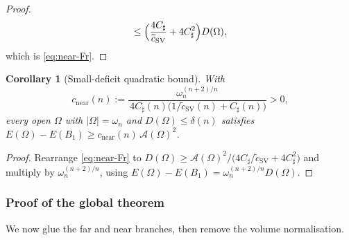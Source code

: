 \documentclass[11pt]{amsart}
\newtheorem{corollary}[theorem]{Corollary}
\theoremstyle{definition}
\newcommand{\Om}{\Omega}
\newcommand{\Fr}{\mathcal A}
\newcommand{\abs}[1]{\left|#1\right|}
\newcommand{\Otilde}{\widetilde{\Omega}}
\begin{document}
\begin{proof}
\begin{align*}
    \le\Bigl(\frac{4C_\sharp}{\widetilde c_{\mathrm{SV}}}+4C_\sharp^2\Bigr)D(\Om),
\end{align*}
which is \eqref{eq:near-Fr}.
\end{proof}

\begin{corollary}[Small-deficit quadratic bound]\label{cor:near}
With
\begin{equation}\label{eq:cnear}
   c_{\mathrm{near}}(n):=
   \frac{\omega_n^{(n+2)/n}}
        {\,4C_\sharp(n)\bigl(1/\widetilde c_{\mathrm{SV}}(n)+C_\sharp(n)\bigr)}>0,
\end{equation}
every open $\Om$ with $\abs{\Om}=\omega_n$ and $D(\Om)\le\delta(n)$
satisfies $E(\Om)-E(B_1)\ge c_{\mathrm{near}}(n)\,\Fr(\Om)^2$.
\end{corollary}

\begin{proof}
Rearrange \eqref{eq:near-Fr} to
$D(\Om)\ge\Fr(\Om)^2/\bigl(4C_\sharp/\widetilde c_{\mathrm{SV}}
+4C_\sharp^2\bigr)$ and multiply by $\omega_n^{(n+2)/n}$, using
$E(\Om)-E(B_1)=\omega_n^{(n+2)/n}D(\Om)$.
\end{proof}

\subsubsection{Proof of the global theorem}\label{ssec:global-proof}

We now glue the far and near branches, then remove the volume
normalisation.
\end{document}
